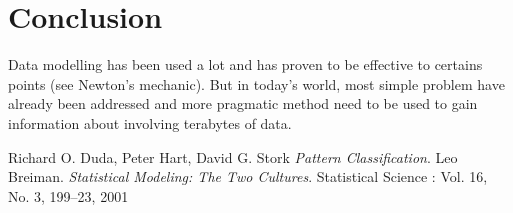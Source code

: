 \documentclass[a4paper,10pt]{article}
\begin{document}
\section{Conclusion}

Data modelling has been used a lot and has proven to be effective to certains points (see Newton's mechanic). But in today's world, most simple problem have already been addressed and more pragmatic method need to be used to gain information about involving terabytes of data.





\begin{thebibliography}{9}
 Richard O. Duda, Peter Hart, David G. Stork \textit{Pattern Classification}. 
 Leo Breiman. \textit{Statistical Modeling: The Two Cultures}. Statistical Science : Vol. 16, No. 3, 199–23, 2001
\end{thebibliography}
\end{document}
